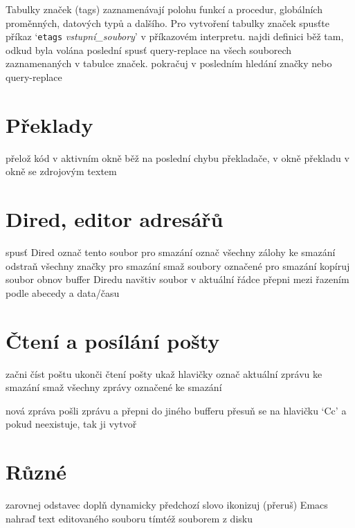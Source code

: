 Tabulky značek (tags) zaznamenávají polohu funkcí a procedur, globálních
proměnných, datových typů a dalšího. Pro vytvoření tabulky značek spusťte
příkaz `{\tt etags} {\it vstupní\_soubory}' v příkazovém interpretu.
\askip
{} najdi definici
 běž tam, odkud byla volána poslední 
 spusť query-replace na všech souborech
zaznamenaných v tabulce značek.
 pokračuj v posledním hledání značky nebo query-replace

\section{Překlady}

 přelož kód v aktivním okně
 běž na poslední chybu překladače, v okně překladu
 v okně se zdrojovým textem

\section{Dired, editor adresářů}

 spusť Dired
 označ tento soubor pro smazání
\key{\~{}} označ všechny zálohy ke smazání
 odstraň všechny značky pro smazání
 smaž soubory označené pro smazání
 kopíruj soubor
 obnov buffer Diredu
 navštiv soubor v aktuální řádce
 přepni mezi řazením podle abecedy a data/času

\section{Čtení a posílání pošty}

 začni číst poštu
 ukonči čtení pošty
 ukaž hlavičky
 označ aktuální zprávu ke smazání
 smaž všechny zprávy označené ke smazání

 nová zpráva
 pošli zprávu a přepni do jiného bufferu
 přesuň se na hlavičku `Cc' a pokud neexistuje, tak ji
vytvoř

\section{Různé}

 zarovnej odstavec
 doplň dynamicky předchozí slovo
 ikonizuj (přeruš) Emacs
 nahraď text editovaného souboru tímtéž souborem z disku

